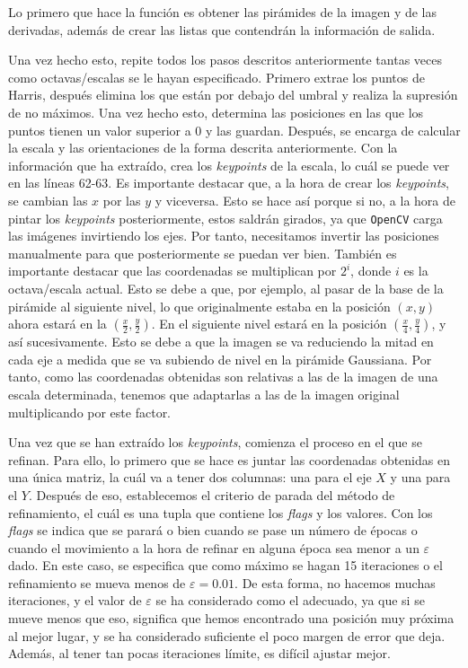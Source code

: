 \documentclass[11pt,a4paper]{article}
\begin{document}
Lo primero que hace la función es obtener las pirámides de la imagen y de las derivadas,
además de crear las listas que contendrán la información de salida.

Una vez hecho esto, repite todos los pasos descritos anteriormente tantas veces como
octavas/escalas se le hayan especificado. Primero extrae los puntos de Harris, después
elimina los que están por debajo del umbral y realiza la supresión de no máximos. Una vez
hecho esto, determina las posiciones en las que los puntos tienen un valor superior a 0 y
las guardan. Después, se encarga de calcular la escala y las orientaciones de la forma
descrita anteriormente. Con la información que ha extraído, crea los \textit{keypoints} de la escala,
lo cuál se puede ver en las líneas 62-63. Es importante destacar que, a la hora
de crear los \textit{keypoints}, se cambian las $x$ por las $y$ y viceversa. Esto se
hace así porque si no, a la hora de pintar los \textit{keypoints} posteriormente, estos
saldrán girados, ya que \texttt{OpenCV} carga las imágenes invirtiendo los ejes. Por tanto,
necesitamos invertir las posiciones manualmente para que posteriormente se puedan ver
bien. También es importante destacar que las coordenadas se multiplican por $2^i$, donde
$i$ es la octava/escala actual. Esto se debe a que, por ejemplo, al pasar de la base de la pirámide
al siguiente nivel,
lo que originalmente estaba en la posición $(x, y)$ ahora estará en la $(\frac{x}{2}, \frac{y}{2})$.
En el siguiente nivel estará en la posición $(\frac{x}{4}, \frac{y}{4})$, y así sucesivamente.
Esto se debe a que la imagen se va reduciendo la mitad en cada eje a medida que se
va subiendo de nivel en la pirámide Gaussiana. Por tanto, como las coordenadas obtenidas
son relativas a las de la imagen de una escala determinada, tenemos que adaptarlas a
las de la imagen original multiplicando por este factor.

Una vez que se han extraído los \textit{keypoints}, comienza el proceso en el que se
refinan. Para ello, lo primero que se hace es juntar las coordenadas obtenidas en una única
matriz, la cuál va a tener dos columnas: una para el eje $X$ y una para el $Y$. Después
de eso, establecemos el criterio de parada del método de refinamiento, el cuál es una tupla
que contiene los \textit{flags} y los valores. Con los \textit{flags} se indica que se parará o
bien cuando se pase un número de épocas o cuando el movimiento a la hora de refinar
en alguna época sea menor a un $\varepsilon$ dado. En este caso, se especifica que como máximo se hagan 15
iteraciones o el refinamiento se mueva menos de $\varepsilon = 0.01$. De esta forma,
no hacemos muchas iteraciones, y el valor de $\varepsilon$ se ha considerado como
el adecuado, ya que si se mueve menos que eso, significa que hemos encontrado
una posición muy próxima al mejor lugar, y se ha considerado suficiente el poco
margen de error que deja. Además, al tener tan pocas iteraciones límite, es difícil
ajustar mejor.
\end{document}
